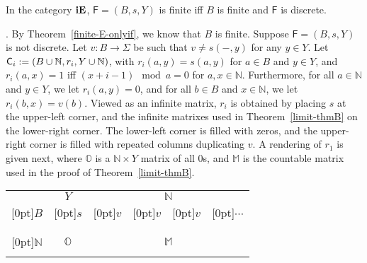 \documentclass{LMCS}
\let\pf\proof
\begin{document}
\begin{thm}\label{finite-if}
  In the category ${\bf iE}$, $\mathsf{F}= (B, s, Y)$ is finite iff $B$ is
  finite and $\mathsf{F}$ is discrete. 
\end{thm}




\pf {\em (Only if)}.  By Theorem~\ref{finite-E-onlyif}, we know that
$B$ is finite.  Suppose $\mathsf{F}= (B, s, Y)$ is not discrete.  Let $v:
B\to \Sigma$ be such that $v\ne s(-, y)$ for any $y\in Y$.  Let ${\sf
  C}_i := (B\cup \mathbb{N}, r_i, Y\cup \mathbb{N} )$, with $r_i (a,
y) = s(a, y)$ for $a\in B$ and $y\in Y$, and $r_i (a, x) = 1$ iff 
$(x+i - 1) \mod a =  0$ for $a, x\in \mathbb{N}$. Furthermore, for all
$a\in \mathbb{N}$ and $y\in Y$, we let $r_i(a,y)=0$, and for all $b
\in B$ and $x\in \mathbb{N}$, we let $r_i(b,x)=v(b)$.  Viewed as an
infinite matrix, $r_i$ is obtained by placing $s$ at the upper-left
corner, and the infinite matrixes used in Theorem~\ref{limit-thmB} on
the lower-right corner. The lower-left corner is filled with zeros,
and the upper-right corner is filled with repeated columns duplicating
$v$.  A rendering of $r_1$ is given next, 
where $\mathbb{O}$ is a $\mathbb{N}\times Y$ matrix of all
$0$s, and $\mathbb{M}$ is the countable matrix used in the proof of
Theorem~\ref{limit-thmB}. 


\begin{center}
\begin{tabular}{c c c  c  c  c c c}
& \multicolumn{3}{c}{$Y$} &  \multicolumn{4}{c}{$\mathbb{N}$} \\  \cline{2-8}
         \raisebox{-1.5ex}[0pt]{$B$}  &     \multicolumn{3}{|c|}{\raisebox{-1.5ex}[0pt]{$s$}} &
                           \multicolumn{1}{|c|}{\raisebox{-1.5ex}[0pt]{$v$}}
                              & \multicolumn{1}{|c|}{\raisebox{-1.5ex}[0pt]{$v$}} &
                             \multicolumn{1}{|c|}{\raisebox{-1.5ex}[0pt]{$v$}}
                                      & \multicolumn{1}{|c|}{\raisebox{-1.5ex}[0pt]{$\cdots$}}  \\
   &       \multicolumn{3}{|c|}{}   &  \multicolumn{1}{|c|}{}  &   \multicolumn{1}{|c|}{} &
                   \multicolumn{1}{|c|}{} &  \multicolumn{1}{|c|}{} \\   \cline{2-8}
       &       \multicolumn{3}{|c|}{}   &  \multicolumn{4}{|c|}{}  \\
\raisebox{0ex}[0pt]{$\mathbb{N}$}  &     \multicolumn{3}{|c|}{$\mathbb{O}$} &      \multicolumn{4}{c|}{$\mathbb{M}$}  \\
& \multicolumn{1}{|c}{}&\multicolumn{1}{c}{}&\multicolumn{1}{c|}{}&   \multicolumn{4}{c|}{}  \\   \cline{2-8}
   \end{tabular}
\end{center}
\end{document}
